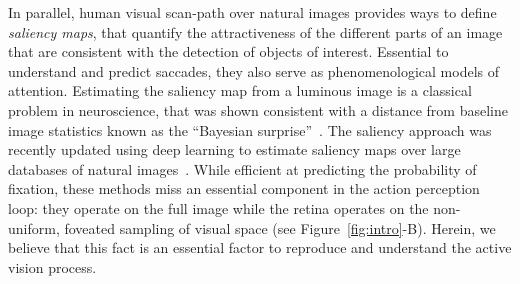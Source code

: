 In parallel, human visual scan-path over natural images provides ways to define \emph{saliency maps}, that quantify the attractiveness of the different parts of an image that are consistent with the detection of objects of interest. Essential to understand and predict saccades, they also serve as phenomenological models of attention. Estimating the saliency map from  a luminous image is a classical problem in neuroscience, that was shown consistent with a distance from baseline image statistics known as the ``Bayesian surprise''~\cite{Itti01}. The saliency approach was recently updated using deep learning to estimate saliency maps over large databases of natural images~\cite{Kummerer17}. %
While  efficient at predicting the probability of fixation, these methods miss an essential component in the action perception loop: they operate on the full image while the retina operates on the non-uniform, foveated sampling of visual space (see Figure~\ref{fig:intro}-B).
Herein, we believe that this fact is an essential factor to reproduce and understand the active vision process.

